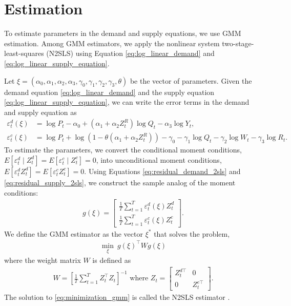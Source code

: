 \documentclass[11pt, a4paper]{article}
\begin{document}
\section{Estimation}
To estimate parameters in the demand and supply equations, we use GMM estimation.
Among GMM estimators, we apply the nonlinear system two-stage-least-squares (N2SLS) using Equation \eqref{eq:log_linear_demand} and \eqref{eq:log_linear_supply_equation}.

Let $\xi = (\alpha_0,\alpha_1, \alpha_2, \alpha_3, \gamma_0,\gamma_1, \gamma_2, \gamma_3, \theta)$ be the vector of parameters. 
Given the demand equation \eqref{eq:log_linear_demand} and the supply equation \eqref{eq:log_linear_supply_equation}, we can write the error terms in the demand and supply equation as
\begin{align}
    {\varepsilon}_t^d(\xi) & =  \log P_{t} - \alpha_0 + (\alpha_1 + \alpha_2 Z^{R}_{t}) \log Q_t - \alpha_3 \log Y_t \label{eq:residual_demand_2sls}, \\
    {\varepsilon}_t^c(\xi) & =  \log P_t + \log(1 - \theta(\alpha_1 + \alpha_2 Z^{R}_{t})) -\gamma_0 - \gamma_1 \log Q_t -  \gamma_2 \log W_{t} -\gamma_3 \log R_t \label{eq:residual_supply_2sls}.
\end{align}
To estimate the parameters, we convert the conditional moment conditions, $E[\varepsilon_t^d\mid Z_t^d] = E[\varepsilon_t^c\mid Z_t^c]=0$, into unconditional moment conditions, $E[\varepsilon_t^d Z_t^d] = E[\varepsilon_t^cZ_t^c]=0$.
Using Equations \eqref{eq:residual_demand_2sls} and \eqref{eq:residual_supply_2sls}, we construct the sample analog of the moment conditions:
\begin{align*}
    g(\xi) = \left[\begin{array}{l}
    \frac{1}{T}\sum_{t=1}^T{\varepsilon}^{d}_{t}(\xi)Z_{t}^{d} \\
    \frac{1}{T}\sum_{t=1}^T{\varepsilon}^{c}_{t}(\xi)Z_{t}^{c}
    \end{array}\right].
\end{align*}
We define the GMM estimator as the vector $\xi^*$ that solves the problem,
\begin{align}
    \min_{\xi}\ g(\xi)^\top W g(\xi) \label{eq:minimization_gmm}
\end{align}
where the weight matrix $W$ is defined as
\begin{align}
    W = \left[\frac{1}{T}\sum_{t = 1}^T Z_t^\top Z_t\right]^{-1} \text{ where } Z_{t}=\left[\begin{array}{ll}
        Z_{t}^{d\top} & 0 \\
        0 & Z_{t}^{c\top}
    \end{array}\right].\label{eq:weight_matrix}
\end{align}
The solution to \eqref{eq:minimization_gmm} is called the N2SLS estimator \citep{wooldridge2010econometric}. 
\end{document}
